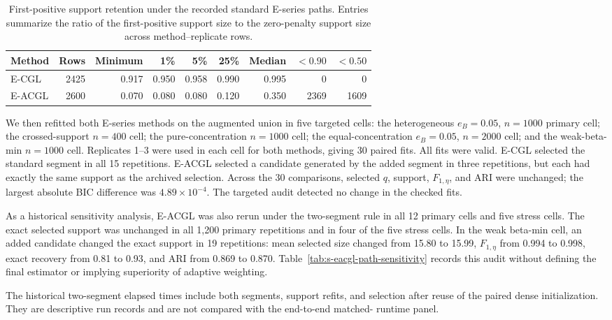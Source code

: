 \documentclass[preprint,12pt,authoryear]{elsarticle}
\begin{document}
\begin{table}[H]
\centering
\small
\setlength{\tabcolsep}{4pt}
\caption{First-positive support retention under the recorded standard
E-series paths. Entries summarize the ratio of the first-positive support size
to the zero-penalty support size across method--replicate rows.}
\label{tab:s-support-retention}
\begin{tabular}{lrrrrrrrr}
\toprule
Method & Rows & Minimum & 1\% & 5\% & 25\% & Median & $<0.90$ & $<0.50$ \\
\midrule
E-CGL  & 2425 & 0.917 & 0.950 & 0.958 & 0.990 & 0.995 & 0 & 0 \\
E-ACGL & 2600 & 0.070 & 0.080 & 0.080 & 0.120 & 0.350 & 2369 & 1609 \\
\bottomrule
\end{tabular}
\end{table}

We then refitted both E-series methods on the augmented union in five targeted
cells: the heterogeneous $e_B=0.05$, $n=1000$ primary cell; the crossed-support
$n=400$ cell; the pure-concentration $n=1000$ cell; the equal-concentration
$e_B=0.05$, $n=2000$ cell; and the weak-beta-min $n=1000$ cell. Replicates
1--3 were used in each cell for both methods, giving 30 paired fits. All fits
were valid. E-CGL selected the standard segment in all 15 repetitions. E-ACGL
selected a candidate generated by the added segment in three repetitions, but
each had exactly the same support as the archived selection. Across the 30
comparisons, selected $q$, support, $F_{1,\eta}$, and ARI were unchanged; the
largest absolute BIC difference was $4.89\times10^{-4}$. The targeted audit
detected no change in the checked fits.

As a historical sensitivity analysis, E-ACGL was also rerun under the
two-segment rule in all 12 primary cells and five stress cells. The exact
selected support was unchanged in all 1,200 primary repetitions and in four
of the five stress cells. In the weak beta-min cell, an added candidate changed
the exact support in 19 repetitions: mean selected size changed from 15.80 to
15.99, $F_{1,\eta}$ from 0.994 to 0.998, exact recovery from 0.81 to 0.93, and
ARI from 0.869 to 0.870. Table~\ref{tab:s-eacgl-path-sensitivity} records this
audit without defining the final estimator or implying superiority of
adaptive weighting.

\clearpage


The historical two-segment elapsed times include both segments, support
refits, and selection after reuse of the paired dense initialization. They are
descriptive run records and are not compared with the end-to-end matched-
runtime panel.
\end{document}
